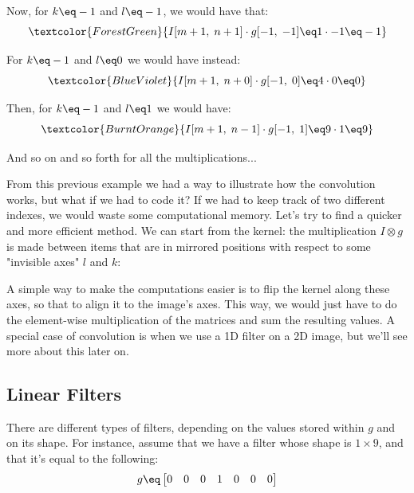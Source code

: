 \begin{example}
    Now, for $k \eq -1$ and $l \eq -1$, we would have that:
    \[ \textcolor{ForestGreen}{I[m + 1, \; n + 1] \cdot g[-1, \; -1] \eq 1 \cdot -1 \eq -1} \]

    For $k \eq -1$ and $l \eq 0$ we would have instead:
    \[ \textcolor{BlueViolet}{I[m + 1, \; n + 0] \cdot g[-1, \; 0] \eq 4 \cdot 0 \eq 0} \]

    Then, for $k \eq -1$ and $l \eq 1$ we would have:
    \[ \textcolor{BurntOrange}{I[m + 1, \; n - 1] \cdot g[-1, \; 1] \eq 9 \cdot 1 \eq 9} \]

    And so on and so forth for all the multiplications...
\end{example}

From this previous example we had a way to illustrate how the convolution works, but what if we had to code it? If we had to keep track of two different indexes, we would waste some computational memory. Let's try to find a quicker and more efficient method. We can start from the kernel: the multiplication $I \otimes g$ is made between items that are in mirrored positions with respect to some "invisible axes" $l$ and $k$:

\begin{center}
\end{center}

A simple way to make the computations easier is to flip the kernel along these axes, so that to align it to the image's axes. This way, we would just have to do the element-wise multiplication of the matrices and sum the resulting values.
\nwl
A special case of convolution is when we use a 1D filter on a 2D image, but we'll see more about this later on.

\subsection{Linear Filters}

There are different types of filters, depending on the values stored within $g$ and on its shape. For instance, assume that we have a filter whose shape is $1 \times 9$, and that it's equal to the following:
\[ g \eq \begin{bmatrix}
    0 & 0 & 0 & 1 & 0 & 0 & 0
\end{bmatrix} \]

